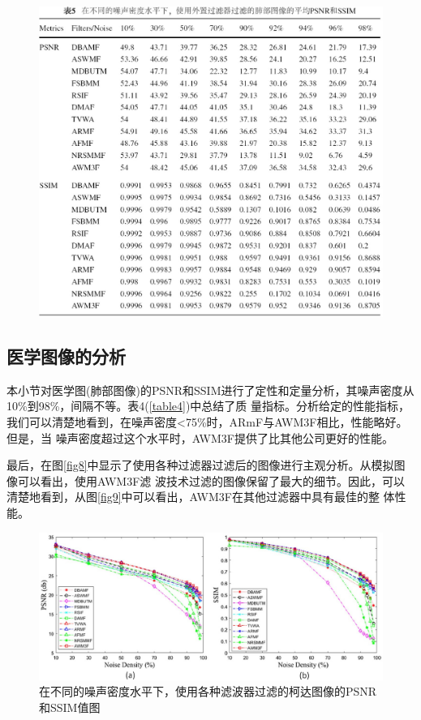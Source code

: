 \documentclass[12pt]{article} %
\begin{document}
\begin{figure}[H]
    \centering
    \includegraphics[width=1\textwidth]{images/13.eps}
    \label{table5}
\end{figure}

\vspace{1em}

\subsection{医学图像的分析}
本小节对医学图(肺部图像)的PSNR和SSIM进行了定性和定量分析，其噪声密度从10\%到98\%，间隔不等。表4(\ref{table4})中总结了质
量指标。分析给定的性能指标，我们可以清楚地看到，在噪声密度<75\%时，ARmF\cite{ref8}与AWM3F\cite{ref23}相比，性能略好。但是，当
噪声密度超过这个水平时，AWM3F\cite{ref23}提供了比其他公司更好的性能。

\hspace{2em}最后，在图\ref{fig8}中显示了使用各种过滤器过滤后的图像进行主观分析。从模拟图像可以看出，使用AWM3F\cite{ref23}滤
波技术过滤的图像保留了最大的细节。因此，可以清楚地看到，从图\ref{fig9}中可以看出，AWM3F\cite{ref23}在其他过滤器中具有最佳的整
体性能。

\begin{figure}[H]
    \centering
    \includegraphics[width=1\textwidth]{images/14.eps}
    \caption{在不同的噪声密度水平下，使用各种滤波器过滤的柯达图像的PSNR和SSIM值图}
    \label{fig10}
\end{figure}
\end{document}
